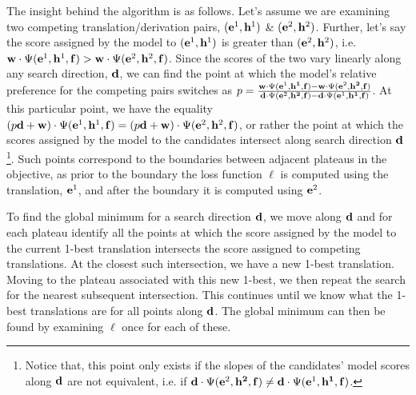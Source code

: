\documentclass[11pt,tightenlines,kern-1pt]{article}
\begin{document}
The insight behind the algorithm is as follows. Let's assume we are examining two competing translation/derivation pairs, \mbox{$({\bf e}^1, {\bf h}^1)$} \& \mbox{$({\bf e}^2, {\bf h}^2)$}. Further, let's say the score assigned by the model to \mbox{$({\bf e}^1, {\bf h}^1)$} is greater than  \mbox{$({\bf e}^2, {\bf h}^2)$}, i.e. \mbox{\mbox{${\bf w} \cdot \Psi({\bf e}^1, {\bf h}^1, {\bf f}) > {\bf w} \cdot \Psi({\bf e}^2, {\bf h}^2, {\bf f})$}}. Since the scores of the two vary linearly along any search direction, \mbox{${\bf d}$}, we can find the point at which the model's relative preference for the competing pairs switches as \mbox{$p = \frac{{\bf w} \cdot \Psi({\bf e}^1, {\bf h^1}, {\bf f}) - {\bf w} \cdot \Psi({\bf e}^2, {\bf h^2}, {\bf f})}{{\bf d} \cdot \Psi({\bf e}^2, {\bf h^2}, {\bf f}) - {\bf d} \cdot \Psi({\bf e}^1, {\bf h^1}, {\bf f})}$}. At this particular point, we have the equality \mbox{$(p{\bf d} + {\bf w}) \cdot \Psi({\bf e}^1, {\bf h}^1, {\bf f}) = (p{\bf d} + {\bf w}) \cdot \Psi({\bf e}^2, {\bf h}^2, {\bf f})$}, or rather the point at which the scores assigned by the model to the candidates intersect along search direction \mbox{${\bf d}$}\footnote{Notice that, this point only exists if the slopes of the candidates' model scores along \mbox{${\bf d}$} are not equivalent, i.e. if \mbox{${\bf d} \cdot \Psi({\bf e}^2, {\bf h^2}, {\bf f}) \neq {\bf d} \cdot \Psi({\bf e}^1, {\bf h^1}, {\bf f})$}.}. Such points correspond to the boundaries between adjacent plateaus in the objective, as prior to the boundary the loss function \mbox{$\ell$} is computed using the translation, \mbox{${\bf e}^1$}, and after the boundary it is computed using \mbox{${\bf e}^2$}. 

To find the global minimum for a search direction \mbox{${\bf d}$}, 
we move along \mbox{${\bf d}$} and for each plateau identify all the points at which the score assigned by the model to the current 1-best translation intersects the score assigned to competing translations. At the closest such intersection, we have a new 1-best translation. Moving to the plateau associated with this new 1-best, we then repeat the search for the nearest subsequent intersection. This continues until we know what the 1-best translations are for all points along \mbox{${\bf d}$}. The global minimum can then be found by examining \mbox{$\ell$} once for each of these.
\end{document}
